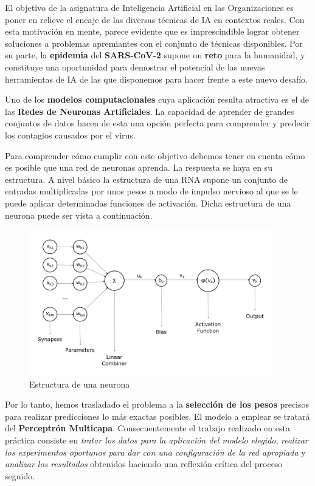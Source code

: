 \documentclass[12pt,a4paper, xcolor=table]{article}
\begin{document}
    El objetivo de la asignatura de Inteligencia Artificial en las Organizaciones es poner en relieve el encaje de las diversas técnicas de IA en contextos reales. Con esta motivación en mente, parece evidente que es imprescindible lograr obtener soluciones a problemas apremiantes con el conjunto de técnicas disponibles. Por su parte, la \textbf{epidemia} del\textbf{ SARS-CoV-2 }supone un \textbf{reto} para la humanidad, y constituye una oportunidad para demostrar el potencial de las nuevas herramientas de IA de las que disponemos para hacer frente a este nuevo desafío.

  \vspace{3mm}

  Uno de los \textbf{modelos computacionales} cuya aplicación resulta atractiva es el de las \textbf{Redes de Neuronas Artificiales}. La capacidad de aprender de grandes conjuntos de datos hacen de esta una opción perfecta para comprender y predecir los contagios causados por el virus.

  \vspace{2mm}

  Para comprender cómo cumplir con este objetivo debemos tener en cuenta cómo es posible que una red de neuronas aprenda. La respuesta se haya en su estructura. A nivel básico la estructura de una RNA supone un conjunto de entradas multiplicadas por unos pesos a modo de impulso nervioso al que se le puede aplicar determinadas funciones de activación. Dicha estructura de una neurona puede ser vista a continuación.

  \begin{figure}[h]
      \centering
      \includegraphics[width=400px]{img/Neuron.png}
      \captionsetup{labelformat=empty}
      \caption{Estructura de una neurona}
  \end{figure}

  Por lo tanto, hemos trasladado el problema a la \textbf{selección de los pesos} precisos para realizar predicciones lo más exactas posibles. El modelo a emplear se tratará del \textbf{Perceptrón Multicapa}. Consecuentemente el trabajo realizado en esta práctica consiste en \textit{tratar los datos para la aplicación del modelo elegido}, \textit{realizar los experimentos oportunos para dar con una configuración de la red apropiada} y \textit{analizar los resultados} obtenidos haciendo una reflexión crítica del proceso seguido.
\end{document}
